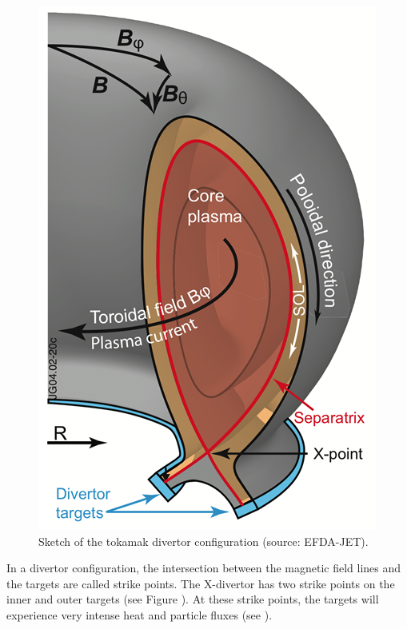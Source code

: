 \begin{figure} [h]
    \centering
    \includegraphics[width=0.5\linewidth]{Figures/Chapter1/sketch_divertor.png}
    \caption{Sketch of the tokamak divertor configuration (source: EFDA-JET).}
\end{figure}

In a divertor configuration, the intersection between the magnetic field lines and the targets are called strike points.
The X-divertor has two strike points on the inner and outer targets (see Figure ).
At these strike points, the targets will experience very intense heat and particle fluxes (see ).

